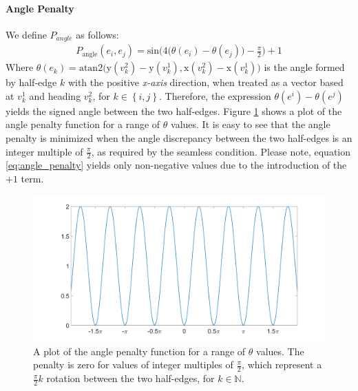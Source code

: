 \paragraph{Angle Penalty}
We define $P_{angle}$ as follows:
\begin{equation}\label{eq:angle_penalty}
\begin{split}
P_{\mathrm{angle}}\left(e_i,e_j\right) = \mathrm{sin} \bigg( 4\Big(\theta\left(e_i\right) - \theta\left(e_j\right)\Big) - \frac{\pi}{2}\bigg) + 1
\end{split}
\end{equation}
Where $\theta\left(e_k\right) = \mathrm{atan2}\Big(\mathrm{y}\left(v_k^2\right) - \mathrm{y}\left(v_k^1\right), \mathrm{x}\left(v_k^2\right) - \mathrm{x}\left(v_k^1\right)\Big)$ is the angle formed by half-edge $k$ with the positive \emph{x-axis} direction, when treated as a vector based at $v_k^1$ and heading $v_k^2$, for $k \in \left\{i,j\right\}$. Therefore, the expression $\theta\left(e^i\right) - \theta\left(e^j\right)$ yields the signed angle between the two half-edges. Figure \ref{fig:angle_penalty} shows a plot of the angle penalty function for a range of $\theta$ values. It is easy to see that the angle penalty is minimized when the angle discrepancy between the two half-edges is an integer multiple of $\frac{\pi}{2}$, as required by the seamless condition. Please note, equation \ref{eq:angle_penalty} yields only non-negative values due to the introduction of the $+1$ term.
\begin{figure}[ht]
\centering
\includegraphics[width=15cm]{figures/seamless/angle_penalty_function.png}
\caption[The Angle Penalty Function]{A plot of the angle penalty function for a range of $\theta$ values. The penalty is zero for values of integer multiples of $\frac{\pi}{2}$, which represent a $\frac{\pi}{2}k$ rotation between the two half-edges, for $k \in \mathbb{N}$.}
\label{fig:angle_penalty}
\end{figure}
